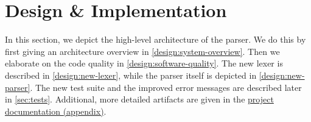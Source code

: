 
\section{Design \& Implementation}
\label{sec:design-implementation} 
In this section, we depict the high-level architecture of the parser.
We do this by first giving an architecture overview in \autoref{design:system-overview}.
Then we elaborate on the code quality in \autoref{design:software-quality}.
The new lexer is described in \autoref{design:new-lexer}, while the parser itself is depicted in \autoref{design:new-parser}.
The new test suite and the improved error messages are described later in \autoref{sec:tests}.
Additional, more detailed artifacts are given in the \hyperref[app:docs]{project documentation (appendix)}.





